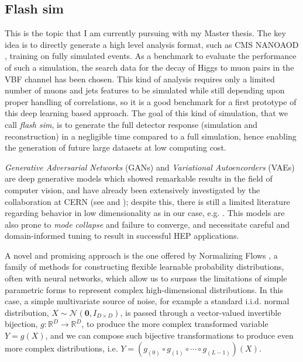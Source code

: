 \documentclass{scrartcl} %
\begin{document}
	\subsection*{Flash sim}
	This is the topic that I am currently pursuing with my Master thesis. The key idea is to directly generate a high level analysis format, such as CMS NANOAOD \cite{2019EPJWC.21406021R}, training on fully simulated events. As a benchmark to evaluate the performance of such a simulation, the search data for the decay of Higgs to muon pairs in the VBF channel has been chosen. This kind of analysis requires only a limited number of muons and jets features to be simulated while still depending upon proper handling of correlations, so it is a good benchmark for a first prototype of this deep learning based approach. The goal of this kind of simulation, that we call \emph{flash sim}, is to generate the full detector response (simulation and reconstruction) in a negligible time compared to a full simulation, hence enabling the generation of future large datasets at low computing cost.
	
	\emph{Generative Adversarial Networks} (GANs) \cite{goodfellow2014generative} and \emph{Variational Autoencorders} (VAEs) \cite{kingma2014autoencoding} are deep generative models which showed remarkable results in the field of computer vision, and have already been extensively investigated by the collaboration at CERN (see \cite{2019glhc} and \cite{otten2021event}); despite this, there is still a limited literature regarding behavior in low dimensionality as in our case, e.g. \cite{523096}. This models are also prone to \emph{mode collapse} and failure to converge, and necessitate careful and domain-informed tuning to result in successful HEP applications.
	
	A novel and promising approach is the one offered by Normalizing Flows \cite{rezende2016variational}, a family of methods for constructing flexible learnable probability distributions, often with neural networks, which allow us to surpass the limitations of simple parametric forms to represent complex high-dimensional distributions. In this case, a simple multivariate source of noise, for example a standard i.i.d. normal distribution, $X\sim\mathcal{N}(\mathbf{0},I_{D\times D})$, is passed through a vector-valued invertible bijection, $g:\mathbb{R}^D\rightarrow\mathbb{R}^D$, to produce the more complex transformed variable $Y=g(X)$, and we can compose such bijective transformations to produce even more complex distributions, i.e. $Y=(g_{(0)}\circ g_{(1)}\circ\cdots\circ g_{(L-1)})(X)$.
	
\end{document}

